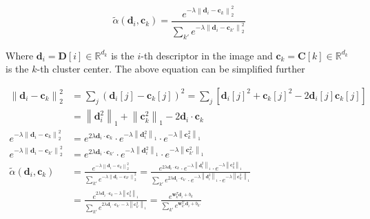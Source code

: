 \begin{equation}
    \tilde{\alpha} \left( \mathbf{d}_i, \mathbf{c}_k \right) = 
        \frac{e^{-\lambda 
            \left\| \mathbf{d}_i - \mathbf{c}_k \right\|_2^2}}
        {\sum_{k'} e^{-\lambda 
            \left\| \mathbf{d}_i - \mathbf{c}_{k'} \right\|_2^2}}
\end{equation}

Where $\mathbf{d}_i = \mathbf{D}[i] \in \mathbb{R}^{d_k}$ is the
$i$-th descriptor in the image and $\mathbf{c}_k = \mathbf{C}[k] \in
\mathbb{R}^{d_k}$ is the $k$-th cluster center. The above equation can
be simplified further

\begin{align*}
    \left\| \mathbf{d}_i - \mathbf{c}_k \right\|_2^2 &= \sum_j \left(
        \mathbf{d}_i[j] - \mathbf{c}_k[j]\right)^2 = \sum_j \left[
        \mathbf{d}_i[j]^2 + \mathbf{c}_k[j]^2 
            - 2\mathbf{d}_i[j]\mathbf{c}_k[j]\right] \\
        &= \left\| \mathbf{d}_i^2 \right\|_1 + 
            \left\| \mathbf{c}_k^2 \right\|_1 - 
            2 \mathbf{d}_i \cdot \mathbf{c}_k \\
    e^{-\lambda\left\| \mathbf{d}_i - \mathbf{c}_k \right\|_2^2} &=
        e^{2\lambda \mathbf{d}_i \cdot \mathbf{c}_k} \cdot
        e^{-\lambda \left\| \mathbf{d}_i^2 \right\|_1} \cdot
        e^{-\lambda \left\| \mathbf{c}_k^2 \right\|_1} \\
    e^{-\lambda\left\| \mathbf{d}_i - \mathbf{c}_{k'} \right\|_2^2} &=
        e^{2\lambda \mathbf{d}_i \cdot \mathbf{c}_{k'}} \cdot
        e^{-\lambda \left\| \mathbf{d}_i^2 \right\|_1} \cdot
        e^{-\lambda \left\| \mathbf{c}_{k'}^2 \right\|_1} \\
    \tilde{\alpha} \left( \mathbf{d}_i, \mathbf{c}_k \right) &= 
        \frac{e^{-\lambda 
            \left\| \mathbf{d}_i - \mathbf{c}_k \right\|_2^2}}
        {\sum_{k'} e^{-\lambda 
            \left\| \mathbf{d}_i - \mathbf{c}_{k'} \right\|_2^2}} =
        \frac{e^{2\lambda \mathbf{d}_i \cdot \mathbf{c}_k} \cdot
            e^{-\lambda \left\| \mathbf{d}_i^2 \right\|_1} \cdot
            e^{-\lambda \left\| \mathbf{c}_k^2 \right\|_1}}{\sum_{k'}
            e^{2\lambda \mathbf{d}_i \cdot \mathbf{c}_{k'}} \cdot
            e^{-\lambda \left\| \mathbf{d}_i^2 \right\|_1} \cdot
            e^{-\lambda \left\| \mathbf{c}_{k'}^2 \right\|_1}} \\
        &= \frac{e^{2\lambda \mathbf{d}_i \cdot \mathbf{c}_k -
                \lambda \left\| \mathbf{c}_k^2 \right\|_1}}{\sum_{k'}
                e^{2\lambda \mathbf{d}_i \cdot \mathbf{c}_{k'} -
                \lambda \left\| \mathbf{c}_{k'}^2 \right\|_1}}
        = \frac{e^{\mathbf{w}_k^T \mathbf{d}_i + b_k}}{\sum_{k'}
        e^{\mathbf{w}_{k'}^T \mathbf{d}_i + b_{k'}}}
\end{align*}

